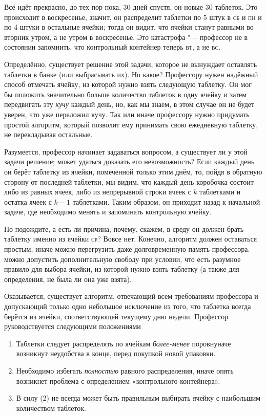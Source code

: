 \documentclass[twoside]{book}
\begin{document}
Всё идёт прекрасно, до тех пор пока, 30 дней спустя, он  новые 30 таблеток.
Это происходит в воскресенье, значит, он распределит таблетки по 5 штук в \textsc{сб} и \textsc{пн} и по 4 штуки в остальные ячейки;
тогда он видит, что ячейки станут равными во вторник утром, а не утром в воскресенье.
Это катастрофа "--- профессор не в состоянии запомнить, что контрольный контейнер теперь \textsc{вт}, а не \textsc{вс}.

Определённо, существует решение этой задачи, которое не вынуждает оставлять таблетки в банке (или выбрасывать их).
Но какое? Профессору нужен надёжный способ отмечать ячейку, из которой нужно взять следующую таблетку.
Он мог бы положить значительно больше количество таблеток в одну ячейку и затем передвигать эту \emph{кучу} каждый день, но, как мы знаем, в этом случае он не будет уверен, что уже переложил кучу.
Так или иначе профессору нужно придумать простой алгоритм, который позволит ему принимать свою ежедневную таблетку, не перекладывая остальные.

Разумеется, профессор начинает задаваться вопросом, а существует ли у этой задачи решение;
может удаться доказать его невозможность?
Если каждый день он берёт таблетку из ячейки, помеченной только этим днём, то, пойдя в обратную сторону от последней таблетки, мы видим, что каждый день коробочка состоит либо из равных ячеек, либо из непрерывной строки ячеек с $k$ таблетками и остатка ячеек с $k-1$ таблетками.
Таким образом, он приходит назад к начальной задаче, где необходимо менять и запоминать контрольную ячейку.

Но подождите, а есть ли причина, почему, скажем, в среду он должен брать таблетку именно из ячейки \textsc{ср}?
Вовсе нет.
Конечно, алгоритм должен оставаться простым, иначе можно перегрузить даже долговременную память профессора.
 можно допустить  дополнительную свободу при условии, что есть разумное правило для выбора ячейки, из которой нужно взять таблетку (а также для определения, не была ли она уже взята).

Оказывается, существует алгоритм, отвечающий всем требованиям профессора и допускающий только одно небольшое исключение из того, что таблетка всегда берётся из ячейки, соответствующей текущему дню недели.
Профессор руководствуется следующими положениями

\begin{enumerate}[label=(\arabic*),noitemsep,leftmargin=\parindent,labelsep=3.5pt]
\item Таблетки следует распределять по ячейкам \emph{более-менее} поровнуначе возникнут неудобства в конце, перед покупкой новой упаковки.
\item Необходимо избегать \emph{полностью} равного распределения, иначе опять возникнет проблема с определением «контрольного контейнера».
\item В силу (2) не всегда может быть правильным выбирать ячейку с наибольшим количеством таблеток.
\end{enumerate}
\end{document}
